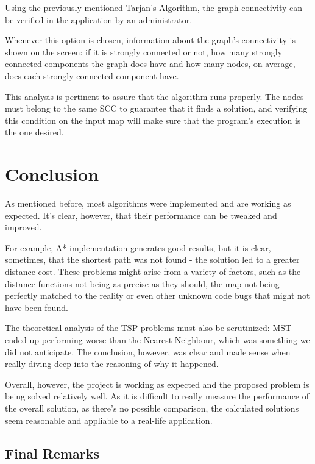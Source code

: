 \documentclass[a4paper, 12pt]{report}
\begin{document}
    Using the previously mentioned \hyperref[alg:tarjan]{Tarjan's Algorithm}, the graph connectivity can be verified in the application by an administrator. 
    
    Whenever this option is chosen, information about the graph's connectivity is shown on the screen: if it is strongly connected or not, how many strongly connected components the graph does have and how many nodes, on average, does each strongly connected component have.
    
    This analysis is pertinent to assure that the algorithm runs properly. The nodes must belong to the same SCC to guarantee that it finds a solution, and verifying this condition on the input map will make sure that the program's execution is the one desired.
    
    
    \chapter{Conclusion} %
    
    As mentioned before, most algorithms were implemented and are working as expected. It's clear, however, that their performance can be tweaked and improved. 
    
    For example, A* implementation generates good results, but it is clear, sometimes, that the shortest path was not found - the solution led to a greater distance cost. These problems might arise from a variety of factors, such as the distance functions not being as precise as they should, the map not being perfectly matched to the reality or even other unknown code bugs that might not have been found.
    
    The theoretical analysis of the TSP problems must also be scrutinized: MST ended up performing worse than the Nearest Neighbour, which was something we did not anticipate. The conclusion, however, was clear and made sense when really diving deep into the reasoning of why it happened.
    
    Overall, however, the project is working as expected and the proposed problem is being solved relatively well. As it is difficult to really measure the performance of the overall solution, as there's no possible comparison, the calculated solutions seem reasonable and appliable to a real-life application.
    
    \section{Final Remarks}
    
\end{document}
